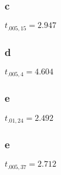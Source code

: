 \documentclass{article}
\begin{document}
		\subsubsection*{c} $t_{.005, 15} = 2.947$
		\subsubsection*{d} $t_{.005, 4} = 4.604$
		\subsubsection*{e} $t_{.01, 24} = 2.492$
		\subsubsection*{e} $t_{.005, 37} = 2.712$		
				
								
		 	
		 	
				
				 
	 		
\end{document}
